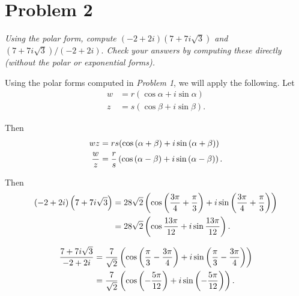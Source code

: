 \documentclass{tufte-handout}
\begin{document}
\section{Problem 2}

\begin{description}
\item \textit{Using the polar form, compute $(-2+2i)(7 + 7i\sqrt{3})$
    and $(7 + 7i\sqrt{3})/(-2 + 2i).$ Check your answers by computing
    these directly (without the polar or exponential forms).}
\end{description}

Using the polar forms computed in \textit{Problem 1}, we will apply
the following. Let
\begin{align*}
  w &= r(\cos \alpha + i \sin \alpha)\\
  z &= s(\cos \beta + i \sin \beta).
\end{align*}

Then
\begin{align*}
  wz &= rs(\cos{(\alpha + \beta)} + i \sin{(\alpha + \beta)})\\
  {w \over z} &= {r \over s} \left( \cos{ (\alpha - \beta)} + i \sin{
                (\alpha - \beta)}\right).
\end{align*}

Then
\begin{align*}
  (-2 + 2i)\left(7 + 7i\sqrt 3\right) &= 28 \sqrt 2 \left( \cos{
                                        \left( {3 \pi \over 4} + {\pi
                                        \over 3}\right)} + i \sin{
                                        \left( {3 \pi \over 4} + {\pi
                                        \over 3}\right)}\right)\\
                                      &= 28 \sqrt 2 \left( \cos{ 13
                                        \pi \over 12} + i \sin{ 13 \pi
                                        \over 12}\right).
\end{align*}

\begin{align*}
  {7 + 7i \sqrt 3 \over -2 + 2i} &= {7 \over \sqrt 2} \left( \cos{
                                   \left( {\pi \over
                                   3} - {3 \pi \over 4} \right)} + i
                                   \sin{ \left( {\pi \over 3} - {3 \pi
                                   \over 4} \right) }\right)\\
                                 &= {7 \over \sqrt 2} \left(
                                   \cos{ \left( -{5 \pi \over 12}
                                   \right)} + i
                                   \sin{ \left( -{5 \pi \over 12}
                                   \right)} \right).\\
\end{align*}
\end{document}
